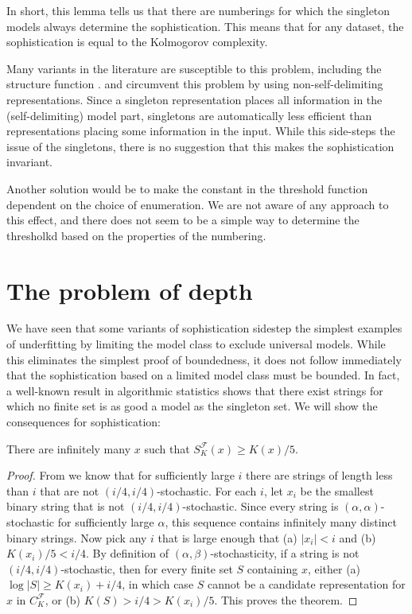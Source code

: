 \documentclass{style/llncs}
\newcommand{\F}{\mathscr F}
\begin{document}
In short, this lemma tells us that there are numberings for which the singleton models always determine the sophistication. This means that for any dataset, the sophistication is equal to the Kolmogorov complexity. 

Many variants in the literature are susceptible to this problem, including the structure function \cite{cover1985kolmogorov,gacs2001algorithmic}. \cite{vitanyi2004meaningful} and \cite{adriaans2012facticity} circumvent this problem by using non-self-delimiting representations. Since a singleton representation places all information in the (self-delimiting) model part, singletons are automatically less efficient than representations placing some information in the input. While this side-steps the issue of the singletons, there is no suggestion that this makes the sophistication invariant.

Another solution would be to make the constant in the threshold function dependent on the choice of enumeration. We are not aware of any approach to this effect, and there does not seem to be a simple way to determine the thresholkd based on the properties of the numbering.

\section{The problem of depth}

We have seen that some variants of sophistication sidestep the simplest examples of underfitting by limiting the model class to exclude universal models. While this eliminates the simplest proof of boundedness, it does not follow immediately that the sophistication based on a limited model class must be bounded. In fact, a well-known result in algorithmic statistics shows that there exist strings for which no finite set is as good a model as the singleton set. We will show the consequences for sophistication:

\begin{theorem}
There are infinitely many $x$ such that $S^\F_K(x) \geq K(x)/5$. \label{theorem:structure-function-is-not-bounded}
\end{theorem}
\begin{proof}
From \cite[Proposition~I.3 (b)]{gacs2001algorithmic} we know that for sufficiently large $i$ there are strings of length less than $i$ that are not $(i/4, i/4)$-stochastic. For each $i$, let $x_i$ be the smallest binary string that is not $(i/4, i/4)$-stochastic. Since every string is $(\alpha,\alpha)$-stochastic for sufficiently large $\alpha$, this sequence contains infinitely many distinct binary strings. Now pick any $i$ that is large enough that (a) $|x_i|<i$ and (b) $K(x_i)/5 < i/4$. By definition of $(\alpha,\beta)$-stochasticity, if a string is not $(i/4,i/4)$-stochastic, then for every finite set $S$ containing $x$, either (a) $\log|S|\ge K(x_i)+i/4$, in which case $S$ cannot be a candidate representation for $x$ in $C^\F_K$, or (b) $K(S)>i/4>K(x_i)/5$. This proves the theorem.
\end{proof}
\end{document}

